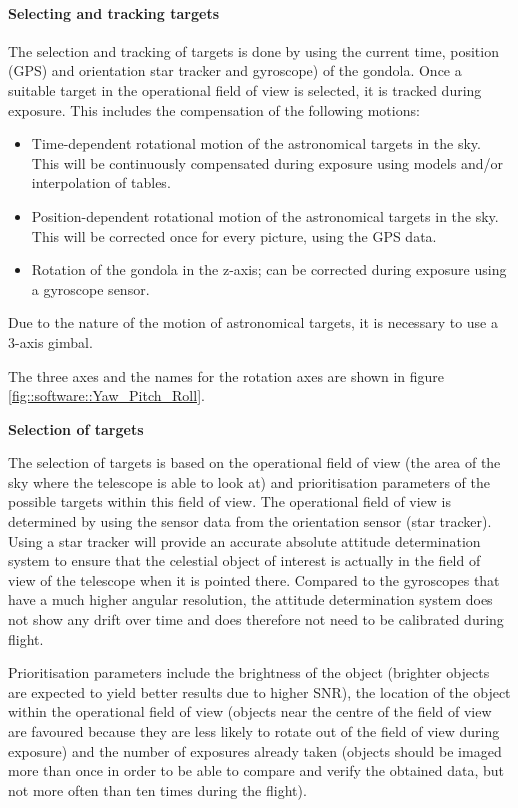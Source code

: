 \paragraph{Selecting and tracking targets}

The selection and tracking of targets is done by using the current time, position (GPS) and orientation star tracker and gyroscope) of the gondola. Once a suitable target in the operational field of view is selected, it is tracked during exposure. This includes the compensation of the following motions:
\begin{itemize}
	\item Time-dependent rotational motion of the astronomical targets in the sky. This will be continuously compensated during exposure using models and/or interpolation of tables.
	\item Position-dependent rotational motion of the astronomical targets in the sky. This will be corrected once for every picture, using the GPS data.
	\item Rotation of the gondola in the z-axis; can be corrected during exposure using a gyroscope sensor.
\end{itemize}

Due to the nature of the motion of astronomical targets, it is necessary to use a 3-axis gimbal.

The three axes and the names for the rotation axes are shown in figure \mbox{\ref{fig::software::Yaw_Pitch_Roll}}.

\textbf{Selection of targets}

The selection of targets is based on the operational field of view (the area of the sky where the telescope is able to look at) and prioritisation parameters of the possible targets within this field of view. The operational field of view is determined by using the sensor data from the orientation sensor (star tracker). Using a star tracker will provide an accurate absolute attitude determination system to ensure that the celestial object of interest is actually in the field of view of the telescope when it is pointed there. Compared to the gyroscopes that have a much higher angular resolution, the attitude determination system does not show any drift over time and does therefore not need to be calibrated during flight.

Prioritisation parameters include the brightness of the object (brighter objects are expected to yield better results due to higher SNR), the location of the object within the operational field of view (objects near the centre of the field of view are favoured because they are less likely to rotate out of the field of view during exposure) and the number of exposures already taken (objects should be imaged more than once in order to be able to compare and verify the obtained data, but not more often than ten times during the flight). 

